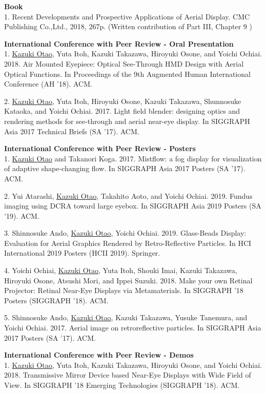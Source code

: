 \documentclass[margin]{res}
\begin{document}
\begin{resume}
{\bf Book} \\
1. Recent Developments and Prospective Applications of Aerial Display. CMC Publishing Co.,Ltd., 2018, 267p. (Written contribution of Part III, Chapter 9 )

{\bf International Conference with Peer Review - Oral Presentation} \\
1. \underline{Kazuki Otao}, Yuta Itoh, Kazuki Takazawa, Hiroyuki Osone, and Yoichi Ochiai. 2018. Air Mounted Eyepiece: Optical See-Through HMD Design with Aerial Optical Functions. In Proceedings of the 9th Augmented Human International Conference (AH ’18). ACM.

2. \underline{Kazuki Otao}, Yuta Itoh, Hiroyuki Osone, Kazuki Takazawa, Shunnosuke Kataoka, and Yoichi Ochiai. 2017. Light field blender: designing optics and rendering methods for see-through and aerial near-eye display. In SIGGRAPH Asia 2017 Technical Briefs (SA '17). ACM.

{\bf International Conference with Peer Review - Posters} \\
1. \underline{Kazuki Otao} and Takanori Koga. 2017. Mistflow: a fog display for visualization of adaptive shape-changing flow. In SIGGRAPH Asia 2017 Posters (SA '17). ACM.

2. Yui Atarashi, \underline{Kazuki Otao}, Takahito Aoto, and Yoichi Ochiai. 2019. Fundus imaging using DCRA toward large eyebox. In SIGGRAPH Asia 2019 Posters (SA ’19). ACM.

3. Shinnosuke Ando, \underline{Kazuki Otao}, Yoichi Ochiai. 2019. Glass-Beads Display: Evaluation for Aerial Graphics Rendered by Retro-Reflective Particles. In HCI International 2019 Posters (HCII 2019). Springer.

4. Yoichi Ochiai, \underline{Kazuki Otao}, Yuta Itoh, Shouki Imai, Kazuki Takazawa, Hiroyuki Osone, Atsushi Mori, and Ippei Suzuki. 2018. Make your own Retinal Projector: Retinal Near-Eye Displays via Metamaterials. In SIGGRAPH ’18 Posters (SIGGRAPH ’18). ACM.

5. Shinnosuke Ando, \underline{Kazuki Otao}, Kazuki Takazawa, Yusuke Tanemura, and Yoichi Ochiai. 2017. Aerial image on retroreflective particles. In SIGGRAPH Asia 2017 Posters (SA '17). ACM.

{\bf International Conference with Peer Review - Demos} \\
1. \underline{Kazuki Otao}, Yuta Itoh, Kazuki Takazawa, Hiroyuki Osone, and Yoichi Ochiai. 2018. Transmissive Mirror Device based Near-Eye Displays with Wide Field of View. In SIGGRAPH ’18 Emerging Technologies (SIGGRAPH ’18). ACM.


\end{resume}
\end{document}
